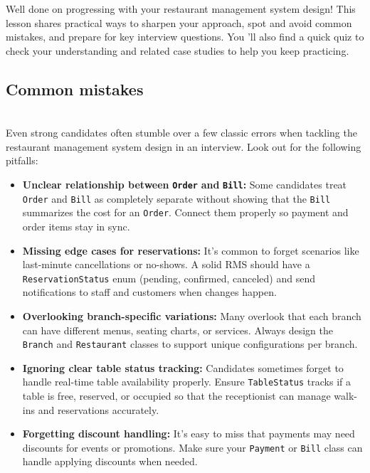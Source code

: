 

Well done on progressing with your restaurant management system design! This lesson shares practical ways to sharpen your approach, spot and avoid common mistakes, and prepare for key interview questions. You 'll also find a quick quiz to check your understanding and related case studies to help you keep practicing.

\subsection{Common mistakes}\label{S7ZwWNE036lmdmCA7zhlO}
\\
Even strong candidates often stumble over a few classic errors when tackling the restaurant management system design in an interview. Look out for the following pitfalls:

\begin{itemize}
\item
\protect{}\label{9MmMNobVgnfu2Y9tgkoco}
\textbf{Unclear relationship between} \textbf{\texttt{Order}} \textbf{and} \textbf{\texttt{Bill}:} Some candidates treat \texttt{Order} and \texttt{Bill} as completely separate without showing that the \texttt{Bill} summarizes the cost for an \texttt{Order}. Connect them properly so payment and order items stay in sync.
\item
\protect{}\label{cTcET90kreLejXXwr9-7x}
\textbf{Missing edge cases for reservations:} It's common to forget scenarios like last-minute cancellations or no-shows. A solid RMS should have a \texttt{ReservationStatus} enum (pending, confirmed, canceled) and send notifications to staff and customers when changes happen.
\item
\protect{}\label{okZShOo5eN7BCJYjcYjRp}
\textbf{Overlooking branch-specific variations:} Many overlook that each branch can have different menus, seating charts, or services. Always design the \texttt{Branch} and \texttt{Restaurant} classes to support unique configurations per branch.
\item
\protect{}\label{ep-_UTHaB4J8uIh-hqOqg}
\textbf{Ignoring clear table status tracking:} Candidates sometimes forget to handle real-time table availability properly. Ensure \texttt{TableStatus} tracks if a table is free, reserved, or occupied so that the receptionist can manage walk-ins and reservations accurately.
\item
\protect{}\label{2vbHzKOeiL2Hm_ID9x42o}
\textbf{Forgetting discount handling:} It's easy to miss that payments may need discounts for events or promotions. Make sure your \texttt{Payment} or \texttt{Bill} class can handle applying discounts when needed.
\end{itemize}


